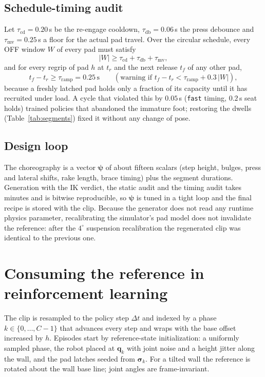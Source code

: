 \documentclass[11pt]{article}
\begin{document}
\subsection{Schedule-timing audit}

Let $\tau_{\mathrm{cd}}=0.20$\,s be the re-engage cooldown,
$\tau_{\mathrm{db}}=0.06$\,s the press debounce and
$\tau_{\mathrm{mv}}=0.25$\,s a floor for the actual pad travel. Over the
circular schedule, every OFF window $W$ of every pad must satisfy
\begin{equation}
  |W|\ge\tau_{\mathrm{cd}}+\tau_{\mathrm{db}}+\tau_{\mathrm{mv}},
\end{equation}
and for every regrip of pad $h$ at $t_r$ and the next release $t_f$ of any
other pad,
\begin{equation}
  t_f-t_r\ge\tau_{\mathrm{ramp}}=0.25\,\mathrm s
  \qquad(\text{warning if }t_f-t_r<\tau_{\mathrm{ramp}}+0.3\,|W|),
\end{equation}
because a freshly latched pad holds only a fraction of its capacity until it
has recruited under load. A cycle that violated this by $0.05$\,s
(\texttt{fast} timing, $0.2$\,s seat holds) trained policies that abandoned
the immature foot; restoring the dwells (Table~\ref{tab:segments}) fixed it
without any change of pose.

\subsection{Design loop}
\label{sec:loop}

The choreography is a vector $\bm\psi$ of about fifteen scalars (step height,
bulges, press and lateral shifts, rake length, brace timing) plus the segment
durations. Generation with the IK verdict, the static audit and the timing
audit takes minutes and is bitwise reproducible, so $\bm\psi$ is tuned in a
tight loop and the final recipe is stored with the clip. Because the
generator does not read any runtime physics parameter, recalibrating the
simulator's pad model does not invalidate the reference: after the
$4^\circ$ suspension recalibration the regenerated clip was identical to the
previous one.

\section{Consuming the reference in reinforcement learning}
\label{sec:rl}

The clip is resampled to the policy step $\Delta t$ and indexed by a phase
$k\in\{0,\dots,C-1\}$ that advances every step and wraps with the base
offset increased by $h$. Episodes start by reference-state initialization: a
uniformly sampled phase, the robot placed at $\bm q_k$ with joint noise and a
height jitter along the wall, and the pad latches seeded from $\bm\sigma_k$.
For a tilted wall the reference is rotated about the wall base line; joint
angles are frame-invariant.
\end{document}
